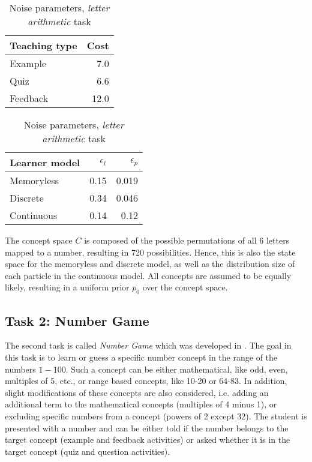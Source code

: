 \begin{table}
\small
\parbox{.49\linewidth}{
    \centering
    \begin{tabular}{l|r}
        \hline
        \textbf{Teaching type} & \textbf{Cost} \\
        \hline
        Example & 7.0 \\
        Quiz    & 6.6 \\
        Feedback & 12.0 \\
        \hline
    \end{tabular}
    \caption{Action costs, \textit{letter arithmetic} task}
    \label{tab:action-cost-t1}
}
\hfill
\parbox{.49\linewidth}{
    \centering
    \begin{tabular}{l|rr}
        \hline
        \textbf{Learner model} & $\epsilon_t$ & $\epsilon_p$ \\
        \hline
        Memoryless  & 0.15 & 0.019 \\
        Discrete    & 0.34 & 0.046 \\
        Continuous  & 0.14 & 0.12 \\
        \hline
    \end{tabular}
    \caption{Noise parameters, \textit{letter arithmetic} task}
    \label{tab:noise-t1}
}
\end{table}


The concept space $C$ is composed of the possible permutations of all 6 letters mapped to a number, resulting in 720 possibilities. Hence, this is also the state space for the memoryless and discrete model, as well as the distribution size of each particle in the continuous model.
All concepts are assumed to be equally likely, resulting in a uniform prior $p_0$ over the concept space.



\subsection{Task 2: Number Game}

The second task is called \textit{Number Game} which was developed in \cite{tenenbaum2000rules}. 
The goal in this task is to learn or guess a specific number concept in the range of the numbers $1-100$. Such a concept can be either mathematical, like odd, even, multiples of 5, etc., or range based concepts, like 10-20 or 64-83. In addition, slight modifications of these concepts are also considered, i.e. adding an additional term to the mathematical concepts (multiples of 4 minus 1), or excluding specific numbers from a concept (powers of 2 except 32). The student is presented with a number and can be either told if the number belongs to the target concept (example and  feedback activities) or asked whether it is in the target concept (quiz and question activities).


